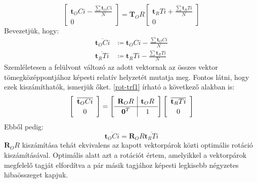 	\begin{equation}
	\label{rot-trf1}
	\left[
	\begin{array}{c}
	 	\mathbf{t}_OCi - \frac{\sum \mathbf{t}_OCi}{N}\\
		0
	\end{array}
	\right]	
	 = \mathbf{T}_OR 
	 \left[
	\begin{array}{c}
	\mathbf{t}_RTi + \frac{\sum \mathbf{t}_RTi}{N} \\ 0
	\end{array}	
	 \right]
	\end{equation}	
	Bevezetjük, hogy:
	\begin{equation*}
	\begin{split}
	 	\overline{\mathbf{t}_OCi} &\coloneqq \mathbf{t}_OCi - \frac{\sum \mathbf{t}_OCi}{N} \\
	 	\overline{\mathbf{t}_RTi} &\coloneqq \mathbf{t}_RTi - \frac{\sum \mathbf{t}_RTi}{N} 
	 	\end{split}
	\end{equation*}
	Szemléletesen a felülvont változó az adott vektornak az összes vektor tömegközéppontjához képesti relatív helyzetét mutatja meg. Fontos látni, hogy ezek kiszámíthatók, ismerjük őket. \eqref{rot-trf1} írható a következő alakban is:
	\begin{equation}
	\left[
	\begin{array}{c}
	 	\overline{\mathbf{t}_OCi}\\
		0
	\end{array}
	\right]	
	 = \left[
	\def\arraystretch{1.2}
	\begin{array}{c|c}
 	\mathbf{R}_OR & \mathbf{t}_OR \\
 	\hline
	\mathbf{0}^T & 1 
	\end{array}	
	\right]
	 \left[
	\begin{array}{c}
	\overline{\mathbf{t}_RTi} \\ 0
	\end{array}	
	 \right]
	\end{equation}
	Ebből pedig:
	\begin{equation}
 	\overline{\mathbf{t}_OCi}	= \mathbf{R}_OR 	\overline{\mathbf{t}_RTi}
	\end{equation}
	$\mathbf{R}_OR$ kiszámítása tehát ekvivalens az kapott vektorpárok közti optimális rotáció kiszámításával. Optimális alatt azt a rotációt értem, amelyikkel a vektorpárok megfelelő tagját elfordítva a pár másik tagjához képesti legkisebb négyzetes hibaösszeget kapjuk.
	
